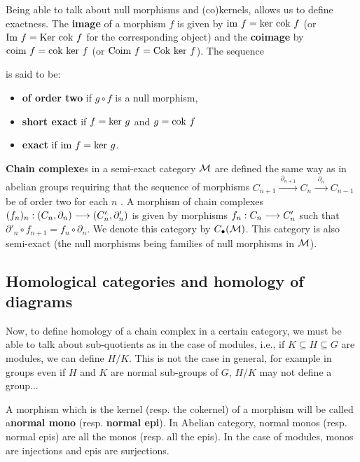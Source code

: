 Being able to talk about null morphisms and (co)kernels, allows us to define exactness. The \textbf{image} of a morphism $f$ is given by $\text{im }f = \text{ker }\text{cok }f$ (or $\text{Im }f = \text{Ker }\text{cok }f$ for the corresponding object) and the \textbf{coimage} by $\text{coim }f = \text{cok }\text{ker }f$ (or $\text{Coim }f = \text{Cok }\text{ker }f$). The sequence 
\begin{center}
\end{center}
is said to be:
\begin{itemize}
	\item \textbf{of order two} if $g \circ f$ is a null morphism,
	\item \textbf{short exact} if $f = \text{ker }g$ and $g = \text{cok }f$
	\item \textbf{exact} if $\text{im }f = \text{ker }g$.
\end{itemize}
\textbf{Chain complexe}s in a semi-exact category $\mathcal{M}$ are defined the same way as in abelian groups requiring that the sequence of morphisms $C_{n+1} \xrightarrow{~\partial_{n+1}~} C_{n} \xrightarrow{~~\partial_n~~} C_{n-1}$ be of order two for each $n$ \cite{grandis91b}. A morphism of chain complexes $(f_n)_{n} : (C_n,\partial_n) \longrightarrow (C'_n,\partial'_n)$ is given by morphisms $f_n : C_n \longrightarrow C'_n$ such that $\partial'_n\circ f_{n+1} = f_{n}\circ\partial_n$.  We denote this category by $C_\bullet(\mathcal{M})$. This category is also semi-exact (the null morphisms being families of null morphisms in $\mathcal{M}$).

	
	\subsection{Homological categories and homology of diagrams}
	
	Now, to define homology of a chain complex in a certain category, we must be able to talk about sub-quotients as in the case of modules, i.e., if $K\subseteq H\subseteq G$ are modules, we can define $H/K$. This is not the case in general, for example in groups even if $H$ and $K$ are normal sub-groups of $G$, $H/K$ may not define a group... 
	
	A morphism which is the kernel (resp. the cokernel) of a morphism will be called a\textbf{normal mono} (resp. \textbf{normal epi}). In Abelian category, normal monos (resp. normal epis) are all the monos (resp. all the epis). In the case of modules, monos are injections and epis are surjections.
	
